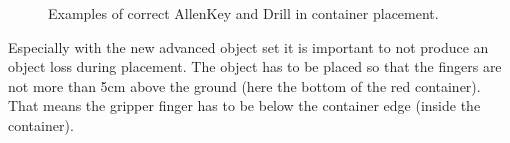 \begin{figure}[h!]
	\begin{center}
		 \hfill
		 \hfill
		 \hfill
		 \hfill
	\end{center}
	\caption{Examples of correct AllenKey and Drill in container placement.}
	\label{fig:example_allenkeyOK}
\end{figure}

Especially with the new advanced object set it is important to not produce an object loss during placement. The object has to be placed so that the fingers are not more than 5cm above the ground (here the bottom of the red container). That means the gripper finger has to be below the container edge (inside the container). 


